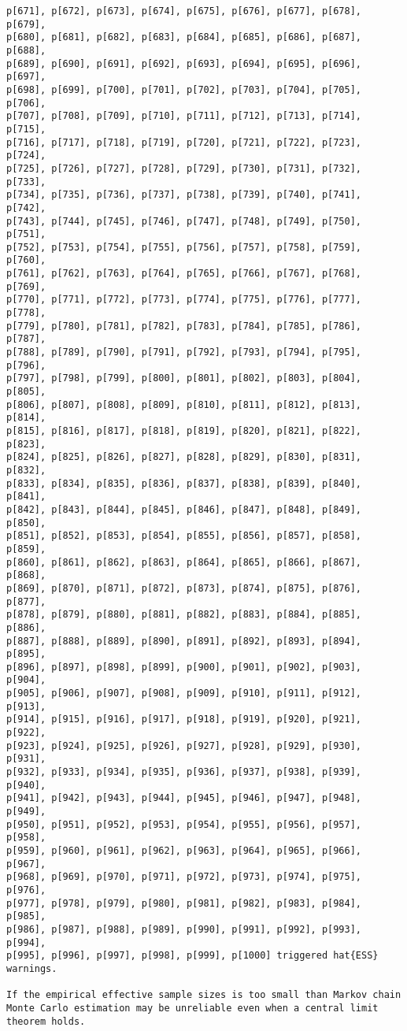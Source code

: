 \documentclass[
  letterpaper,
  DIV=11,
  numbers=noendperiod]{scrartcl}
\begin{document}
\begin{verbatim}
p[671], p[672], p[673], p[674], p[675], p[676], p[677], p[678], p[679],
p[680], p[681], p[682], p[683], p[684], p[685], p[686], p[687], p[688],
p[689], p[690], p[691], p[692], p[693], p[694], p[695], p[696], p[697],
p[698], p[699], p[700], p[701], p[702], p[703], p[704], p[705], p[706],
p[707], p[708], p[709], p[710], p[711], p[712], p[713], p[714], p[715],
p[716], p[717], p[718], p[719], p[720], p[721], p[722], p[723], p[724],
p[725], p[726], p[727], p[728], p[729], p[730], p[731], p[732], p[733],
p[734], p[735], p[736], p[737], p[738], p[739], p[740], p[741], p[742],
p[743], p[744], p[745], p[746], p[747], p[748], p[749], p[750], p[751],
p[752], p[753], p[754], p[755], p[756], p[757], p[758], p[759], p[760],
p[761], p[762], p[763], p[764], p[765], p[766], p[767], p[768], p[769],
p[770], p[771], p[772], p[773], p[774], p[775], p[776], p[777], p[778],
p[779], p[780], p[781], p[782], p[783], p[784], p[785], p[786], p[787],
p[788], p[789], p[790], p[791], p[792], p[793], p[794], p[795], p[796],
p[797], p[798], p[799], p[800], p[801], p[802], p[803], p[804], p[805],
p[806], p[807], p[808], p[809], p[810], p[811], p[812], p[813], p[814],
p[815], p[816], p[817], p[818], p[819], p[820], p[821], p[822], p[823],
p[824], p[825], p[826], p[827], p[828], p[829], p[830], p[831], p[832],
p[833], p[834], p[835], p[836], p[837], p[838], p[839], p[840], p[841],
p[842], p[843], p[844], p[845], p[846], p[847], p[848], p[849], p[850],
p[851], p[852], p[853], p[854], p[855], p[856], p[857], p[858], p[859],
p[860], p[861], p[862], p[863], p[864], p[865], p[866], p[867], p[868],
p[869], p[870], p[871], p[872], p[873], p[874], p[875], p[876], p[877],
p[878], p[879], p[880], p[881], p[882], p[883], p[884], p[885], p[886],
p[887], p[888], p[889], p[890], p[891], p[892], p[893], p[894], p[895],
p[896], p[897], p[898], p[899], p[900], p[901], p[902], p[903], p[904],
p[905], p[906], p[907], p[908], p[909], p[910], p[911], p[912], p[913],
p[914], p[915], p[916], p[917], p[918], p[919], p[920], p[921], p[922],
p[923], p[924], p[925], p[926], p[927], p[928], p[929], p[930], p[931],
p[932], p[933], p[934], p[935], p[936], p[937], p[938], p[939], p[940],
p[941], p[942], p[943], p[944], p[945], p[946], p[947], p[948], p[949],
p[950], p[951], p[952], p[953], p[954], p[955], p[956], p[957], p[958],
p[959], p[960], p[961], p[962], p[963], p[964], p[965], p[966], p[967],
p[968], p[969], p[970], p[971], p[972], p[973], p[974], p[975], p[976],
p[977], p[978], p[979], p[980], p[981], p[982], p[983], p[984], p[985],
p[986], p[987], p[988], p[989], p[990], p[991], p[992], p[993], p[994],
p[995], p[996], p[997], p[998], p[999], p[1000] triggered hat{ESS}
warnings.

If the empirical effective sample sizes is too small than Markov chain
Monte Carlo estimation may be unreliable even when a central limit
theorem holds.
\end{verbatim}
\end{document}
